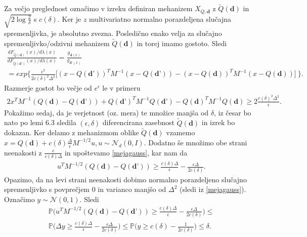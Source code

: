 \documentclass[12pt,a4paper]{amsart}
\theoremstyle{definition} %
\theoremstyle{plain} %
\begin{document}
Za večjo preglednost označimo v izreku definiran mehanizem $X_{Q, \textbf{d}}$ z $\tilde{Q}(\textbf{d})$ in  $\sqrt{2\log{\frac{2}{\delta}}}$ s $c(\delta)$. Ker je $z$ multivariatno normalno porazdeljena slučajna spremenljivka, je absolutno zvezna. Posledično enako velja za slučajno spremenljivko/odzivni mehanizem $\tilde{Q}(\textbf{d})$ in torej imamo gostoto. Sledi
\begin{gather*}
\frac{dF_{\tilde{Q}(\textbf{d})}(x)/d \lambda (x)}{dF_{\tilde{Q}(\textbf{d'})}(x)/d \lambda (x)} = \frac{g_{\textbf{d} (x)}}{g_{\textbf{d'} (x)}} \\ 
=  exp \bigg\{ \frac{\epsilon^2}{2c(\delta)^2 \Delta^2} \Big[ (x-Q(\textbf{d'}))^T M^{-1} (x-Q(\textbf{d'})) - (x-Q(\textbf{d}))^T M^{-1} (x-Q(\textbf{d}))\Big]\ \bigg\}.
\end{gather*}
Razmerje gostot bo večje od $e^{\epsilon}$ le v primeru
\begin{gather*}
2x^T M^{-1}(Q(\textbf{d})-Q(\textbf{d'})) + Q(\textbf{d'})^T M^{-1} Q(\textbf{d'}) - Q(\textbf{d})^T M^{-1} Q(\textbf{d}) \geq 2 \frac{c(\delta)^2 \Delta^2}{\epsilon}.
\end{gather*}
Pokažimo sedaj, da je verjetnost (oz. mera) te množice manjša od $\delta$, iz česar bo nato po lemi 6.3 sledila $(\epsilon, \delta)$  diferencirana zasebnost $\tilde{Q}(\textbf{d})$ in izrek bo dokazan.
\newline
\newline
Ker delamo z mehanizmom oblike $\tilde{Q}(\textbf{d})$ vzamemo $x = Q(\textbf{d}) + c(\delta) \frac{\Delta}{\epsilon} M^{-1/2}u, u \sim \mathcal{N}_d (0,I)$. Dodatno še množimo obe strani neenakosti z $\frac{\epsilon}{c(\delta)\Delta}$ in upoštevamo \eqref{mejagauss}, kar nam da
\begin{gather*}
u^T M^{-1/2}(Q(\textbf{d})-Q(\textbf{d'})) \geq \frac{c(\delta)\Delta}{\epsilon} - \frac{\epsilon \Delta}{2 c(\delta)}.
\end{gather*}
Opazimo, da na levi strani neenakosti dobimo normalno porazdeljeno slučajno spremenljivko s povprečjem 0 in varianco manjšo od $\Delta^2$ (sledi iz \eqref{mejagauss}). Označimo $y \sim \mathcal{N}(0,1)$. Sledi 
\begin{gather*}
\mathbb{P}\Big(u^T M^{-1/2}(Q(\textbf{d})-Q(\textbf{d'})) \geq \frac{c(\delta)\Delta}{\epsilon} - \frac{\epsilon \Delta}{2 c(\delta)}\Big) \leq \\
\mathbb{P}\Big(\Delta y \geq \frac{c(\delta)\Delta}{\epsilon} - \frac{\epsilon \Delta}{2 c(\delta)}\Big) \leq \mathbb{P}\Big(y \geq c(\delta) - \frac{1}{2 c(\delta)}\Big) \leq \delta.
\end{gather*}
\end{document}
